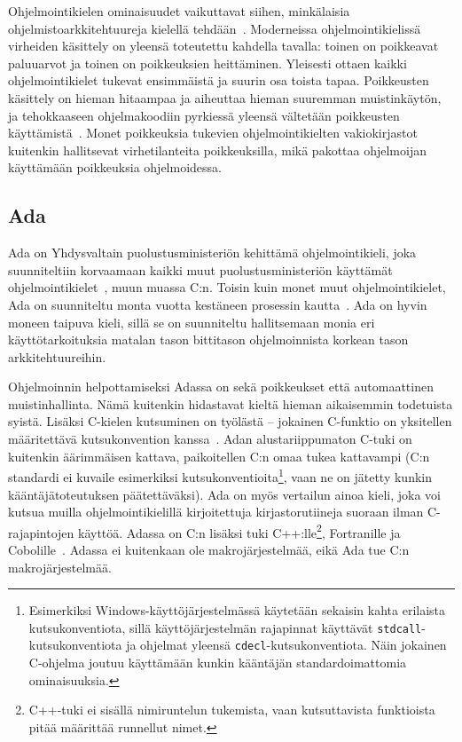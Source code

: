 Ohjelmointikielen ominaisuudet vaikuttavat siihen, minkälaisia
ohjelmistoarkkitehtuureja kielellä tehdään~\citep{designpatternsdesign}.
Moderneissa ohjelmointikielissä virheiden käsittely on yleensä toteutettu
kahdella tavalla: toinen on poikkeavat paluuarvot ja toinen on poikkeuksien
heittäminen. Yleisesti ottaen kaikki ohjelmointikielet tukevat ensimmäistä ja
suurin osa toista tapaa. Poikkeusten käsittely on hieman hitaampaa ja aiheuttaa
hieman suuremman muistinkäytön, ja tehokkaaseen ohjelmakoodiin pyrkiessä
yleensä vältetään poikkeusten käyttämistä~\citep{exceptioncosts}. Monet
poikkeuksia tukevien ohjelmointikielten vakiokirjastot kuitenkin hallitsevat
virhetilanteita poikkeuksilla, mikä pakottaa ohjelmoijan käyttämään poikkeuksia
ohjelmoidessa.


\subsection{Ada}

Ada on Yhdysvaltain puolustusministeriön kehittämä ohjelmointikieli, joka
suunniteltiin korvaamaan kaikki muut puolustusministeriön käyttämät
ohjelmointikielet~\citep{adahistory}, muun muassa C:n. Toisin kuin monet muut
ohjelmointikielet, Ada on suunniteltu monta vuotta kestäneen prosessin
kautta~\citep[s.~121]{theoryandpractice}. Ada on hyvin moneen taipuva kieli,
sillä se on suunniteltu hallitsemaan monia eri käyttötarkoituksia matalan tason
bittitason ohjelmoinnista korkean tason arkkitehtuureihin.

Ohjelmoinnin helpottamiseksi Adassa on sekä poikkeukset että automaattinen
muistinhallinta. Nämä kuitenkin hidastavat kieltä hieman aikaisemmin todetuista
syistä. Lisäksi C-kielen kutsuminen on työlästä  -- jokainen C-funktio on
yksitellen määritettävä kutsukonvention
kanssa~\citep[s.~471]{ADA12}. Adan alustariippumaton C-tuki on kuitenkin
äärimmäisen kattava, paikoitellen C:n omaa tukea kattavampi (C:n standardi ei
kuvaile esimerkiksi kutsukonventioita\footnote{Esimerkiksi
Windows-käyttöjärjestelmässä käytetään sekaisin kahta erilaista
kutsukonventiota, sillä käyttöjärjestelmän rajapinnat käyttävät
\texttt{stdcall}-kutsukonventiota ja ohjelmat yleensä
\texttt{cdecl}-kutsukonventiota. Näin jokainen C-ohjelma joutuu käyttämään
kunkin kääntäjän standardoimattomia ominaisuuksia.}, vaan ne on jätetty kunkin
kääntäjätoteutuksen päätettäväksi). Ada on myös vertailun ainoa kieli, joka voi
kutsua muilla ohjelmointikielillä kirjoitettuja kirjastorutiineja suoraan ilman
C-rajapintojen käyttöä. Adassa on C:n lisäksi tuki C++:lle\footnote{C++-tuki ei
sisällä nimiruntelun tukemista, vaan kutsuttavista funktioista pitää määrittää
runnellut nimet.}, Fortranille ja Cobolille~\citep[s.~585]{ADA12}. Adassa ei
kuitenkaan ole makrojärjestelmää, eikä Ada tue C:n makrojärjestelmää.

